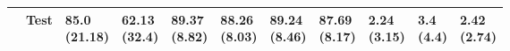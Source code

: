 \begin{table}
\begin{tabular}{lllllllllll}
       & Test &   \makecell{85.0\\(21.18)} &   \makecell{62.13\\(32.4)} &  \makecell{89.37\\(8.82)} &  \makecell{88.26\\(8.03)} &  \makecell{89.24\\(8.46)} &  \makecell{87.69\\(8.17)} &      \makecell{2.24\\(3.15)} &    \makecell{3.4\\(4.4)} &  \makecell{2.42\\(2.74)} \\
\bottomrule
\end{tabular}
\end{table}
